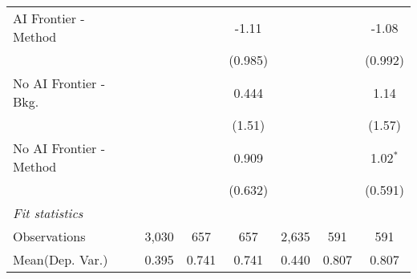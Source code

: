 \begin{tabular}{lcccccc}
   AI Frontier - Method    &               &              & -1.11         &               &             & -1.08\\   
                           &               &              & (0.985)       &               &             & (0.992)\\   
   No AI Frontier - Bkg.   &               &              & 0.444         &               &             & 1.14\\   
                           &               &              & (1.51)        &               &             & (1.57)\\   
   No AI Frontier - Method &               &              & 0.909         &               &             & 1.02$^{*}$\\   
                           &               &              & (0.632)       &               &             & (0.591)\\   
   \midrule
   \emph{Fit statistics}\\
   Observations            & 3,030         & 657          & 657           & 2,635         & 591         & 591\\  
Mean(Dep. Var.) & 0.395 & 0.741 & 0.741 & 0.440 & 0.807 & 0.807 \\
   

\end{tabular}
